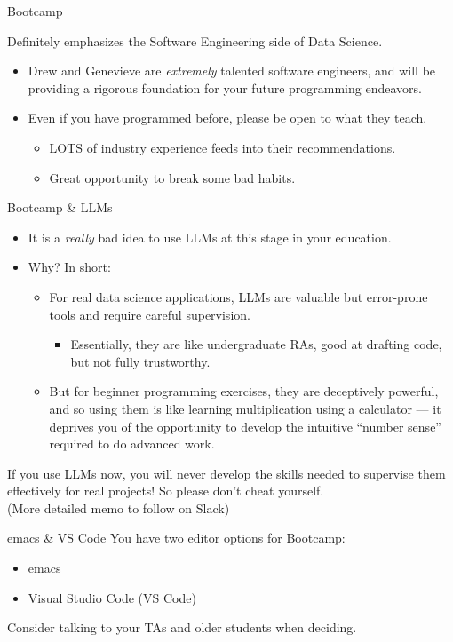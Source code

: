 \documentclass[11pt]{beamer}
\begin{document}
\begin{frame}[c]{Bootcamp}

Definitely emphasizes the Software Engineering side of Data Science.

\begin{itemize}
	\pause \item Drew and Genevieve are \emph{extremely} talented software engineers, and will be providing a rigorous foundation for your future programming endeavors.
	\pause \item Even if you have programmed before, please be open to what they teach.
	\begin{itemize}
		\item LOTS of industry experience feeds into their recommendations.
		\item Great opportunity to break some bad habits.
	\end{itemize}
\end{itemize}

\end{frame}

\begin{frame}[c]{Bootcamp \& LLMs}
\begin{itemize}
	\pause \item It is a \emph{really} bad idea to use LLMs at this stage in your education.
	\pause \item Why? In short: 
	\begin{itemize}
		\pause \item For \alert{real} data science applications, LLMs are \alert{valuable but error-prone} tools and require careful supervision. 
		\begin{itemize}
			\pause \item Essentially, they are like undergraduate RAs, good at drafting code, but not fully trustworthy.
		\end{itemize}
		\pause \item But for beginner programming exercises, they are deceptively powerful, and so using them is like learning multiplication using a calculator — it deprives you of the opportunity to develop the intuitive ``number sense'' required to do advanced work.
	\end{itemize}
\end{itemize}
\pause \alert{If you use LLMs now, you will never develop the skills needed to supervise them effectively for real projects!} So please don't cheat yourself.\\
\pause (More detailed memo to follow on Slack)
\end{frame}

\begin{frame}[c]{emacs \& VS Code}
You have two editor options for Bootcamp:
\begin{itemize}
	\item emacs
	\item Visual Studio Code (VS Code)
\end{itemize}
\pause Consider talking to your TAs and older students when deciding.
\end{frame}
\end{document}
